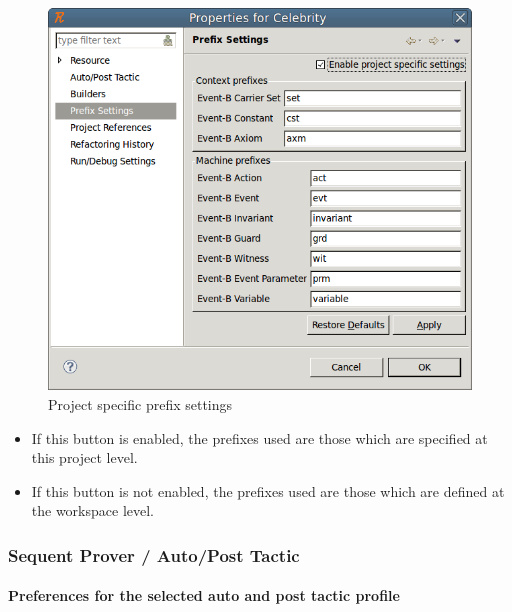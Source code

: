 \begin{figure}[!ht]
\begin{center}
	\includegraphics{img/reference/ref_01_preferences2.png}
	\caption{Project specific prefix settings}
	\label{fig_ref_01_preferences2}
\end{center}
\end{figure}

\begin{itemize}
	\item If this button is enabled, the prefixes used are those which are specified at this project level.
	\item If this button is not enabled, the prefixes used are those which are defined at the workspace level. 
\end{itemize}

\subsubsection{Sequent Prover / Auto/Post Tactic}
\label{ref_01_preferences_auto_post_tactic}

\paragraph{Preferences for the selected auto and post tactic profile}

